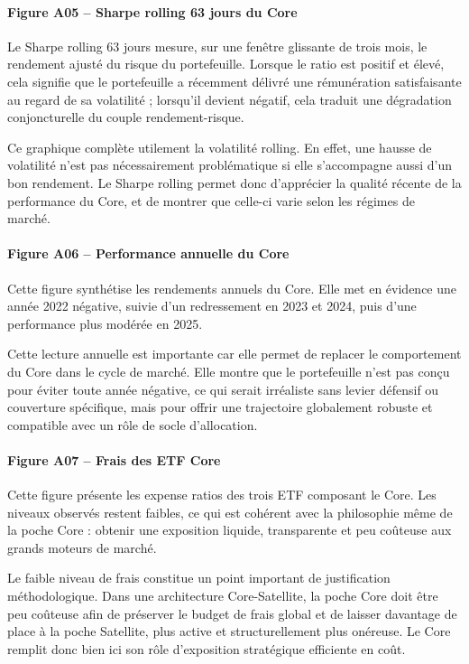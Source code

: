 \documentclass{article}
\begin{document}
\paragraph{Figure A05 -- Sharpe rolling 63 jours du Core}
Le Sharpe rolling 63 jours mesure, sur une fenêtre glissante de trois mois, le rendement ajusté du risque du portefeuille. Lorsque le ratio est positif et élevé, cela signifie que le portefeuille a récemment délivré une rémunération satisfaisante au regard de sa volatilité ; lorsqu’il devient négatif, cela traduit une dégradation conjoncturelle du couple rendement-risque.

Ce graphique complète utilement la volatilité rolling. En effet, une hausse de volatilité n’est pas nécessairement problématique si elle s’accompagne aussi d’un bon rendement. Le Sharpe rolling permet donc d’apprécier la qualité récente de la performance du Core, et de montrer que celle-ci varie selon les régimes de marché.

\paragraph{Figure A06 -- Performance annuelle du Core}
Cette figure synthétise les rendements annuels du Core. Elle met en évidence une année 2022 négative, suivie d’un redressement en 2023 et 2024, puis d’une performance plus modérée en 2025.

Cette lecture annuelle est importante car elle permet de replacer le comportement du Core dans le cycle de marché. Elle montre que le portefeuille n’est pas conçu pour éviter toute année négative, ce qui serait irréaliste sans levier défensif ou couverture spécifique, mais pour offrir une trajectoire globalement robuste et compatible avec un rôle de socle d’allocation.

\paragraph{Figure A07 -- Frais des ETF Core}
Cette figure présente les expense ratios des trois ETF composant le Core. Les niveaux observés restent faibles, ce qui est cohérent avec la philosophie même de la poche Core : obtenir une exposition liquide, transparente et peu coûteuse aux grands moteurs de marché.

Le faible niveau de frais constitue un point important de justification méthodologique. Dans une architecture Core-Satellite, la poche Core doit être peu coûteuse afin de préserver le budget de frais global et de laisser davantage de place à la poche Satellite, plus active et structurellement plus onéreuse. Le Core remplit donc bien ici son rôle d’exposition stratégique efficiente en coût.
\end{document}
